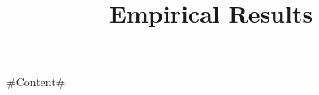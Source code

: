 \documentclass{article}
\title{Empirical Results}
\begin{document}
\maketitle
\footnotesize

#Content#
\end{document}
